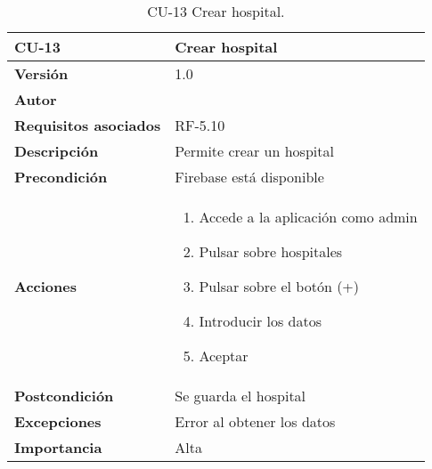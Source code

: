 \begin{table}[p]
	\centering
	\begin{tabularx}{\linewidth}{ p{} p{} }
		\toprule
		\textbf{CU-13}    & \textbf{Crear hospital}\\
		\toprule
		\textbf{Versión}              & 1.0    \\
		\textbf{Autor}                & {\nombre} \\
		\textbf{Requisitos asociados} & RF-5.10 \\
		\textbf{Descripción}          & Permite crear un hospital \\
		\textbf{Precondición}         & Firebase está disponible \\
		\textbf{Acciones}             &
		\begin{enumerate}
			\def\labelenumi{\arabic{enumi}.}
			\tightlist
			\item Accede a la aplicación como admin
			\item Pulsar sobre hospitales
			\item Pulsar sobre el botón (+)
			\item Introducir los datos
			\item Aceptar
		\end{enumerate}\\
		\textbf{Postcondición}        & Se guarda el hospital\\
		\textbf{Excepciones}          & Error al obtener los datos \\
		\textbf{Importancia}          & Alta \\
		\bottomrule
	\end{tabularx}
	\caption{CU-13 Crear hospital.}
\end{table}

